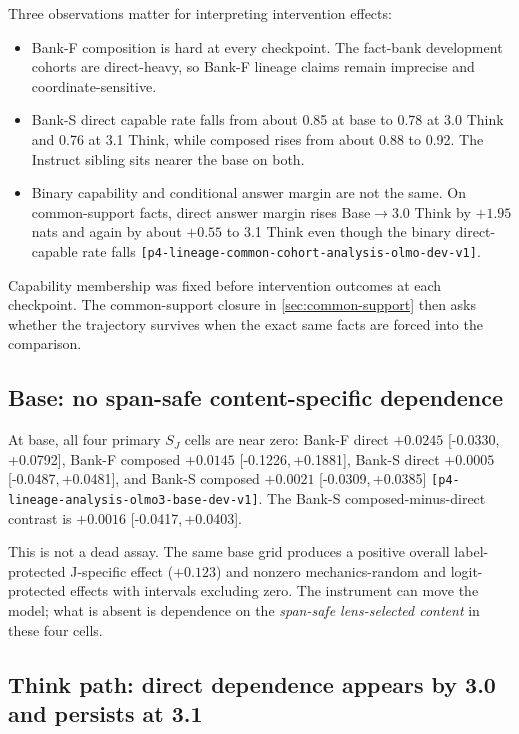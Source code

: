 \documentclass[11pt]{article}
\newcommand{\eid}[1]{{\footnotesize\nolinkurl{[#1]}}}
\newcommand{\ci}[2]{{[#1,\,#2]}}
\newcommand{\SJ}{S_J}
\begin{document}
Three observations matter for interpreting intervention effects:
\begin{itemize}
  \item Bank-F composition is hard at every checkpoint. The fact-bank
  development cohorts are direct-heavy, so Bank-F lineage claims remain
  imprecise and coordinate-sensitive.
  \item Bank-S direct capable rate falls from about 0.85 at base to 0.78 at
  3.0 Think and 0.76 at 3.1 Think, while composed rises from about 0.88 to
  0.92. The Instruct sibling sits nearer the base on both.
  \item Binary capability and conditional answer margin are not the same.
  On common-support facts, direct answer margin rises Base$\to$3.0 Think by
  $+1.95$ nats and again by about $+0.55$ to 3.1 Think even though the binary
  direct-capable rate falls \eid{p4-lineage-common-cohort-analysis-olmo-dev-v1}.
\end{itemize}

Capability membership was fixed before intervention outcomes at each
checkpoint. The common-support closure in \cref{sec:common-support} then asks
whether the trajectory survives when the exact same facts are forced into the
comparison.

\subsection{Base: no span-safe content-specific dependence}

At base, all four primary $\SJ$ cells are near zero:
Bank-F direct $+0.0245$ \ci{-0.0330}{+0.0792}, Bank-F composed $+0.0145$
\ci{-0.1226}{+0.1881}, Bank-S direct $+0.0005$
\ci{-0.0487}{+0.0481}, and Bank-S composed $+0.0021$
\ci{-0.0309}{+0.0385} \eid{p4-lineage-analysis-olmo3-base-dev-v1}.
The Bank-S composed-minus-direct contrast is $+0.0016$
\ci{-0.0417}{+0.0403}.

This is not a dead assay. The same base grid produces a positive overall
label-protected J-specific effect ($+0.123$) and nonzero mechanics-random and
logit-protected effects with intervals excluding zero. The instrument can move
the model; what is absent is dependence on the \emph{span-safe lens-selected
content} in these four cells.

\subsection{Think path: direct dependence appears by 3.0 and persists at 3.1}
\end{document}
